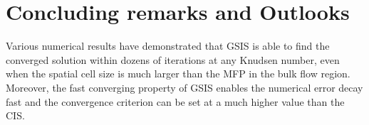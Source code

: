 %
%
%








\section{Concluding remarks and Outlooks}\label{sec:summary}

Various numerical results have demonstrated that GSIS is able to find the converged solution within dozens of iterations at any Knudsen number, even when the spatial cell size is much larger than the MFP in the bulk flow region. Moreover, the fast converging property of GSIS enables the numerical error decay fast and the convergence criterion can be set at a much higher value than the CIS. 

